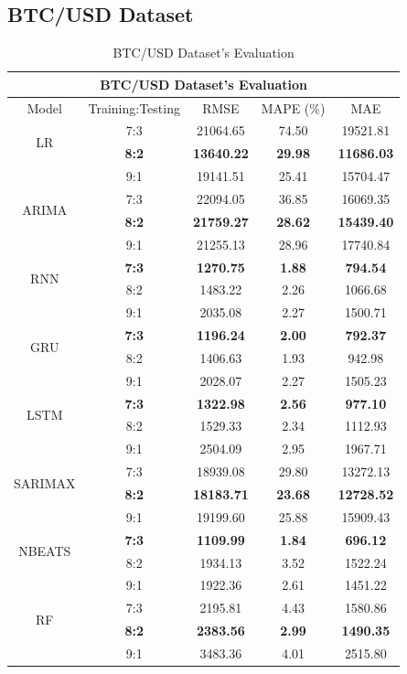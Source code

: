 \documentclass{ieeeojies}
\begin{document}
\subsection{BTC/USD Dataset}
\begin{table}[H]
	\centering
	\begin{tabular}{|c|c|c|c|c|}
		\hline
		\multicolumn{5}{|c|}{\textbf{BTC/USD Dataset's Evaluation}}\\
		\hline
		\centering Model & Training:Testing & RMSE & MAPE (\%) & MAE\\
		\hline
		\multirow{2}{*}{LR} & 7:3 & 21064.65 &  74.50 &  19521.81 \\ & \textbf{8:2} & \textbf{13640.22} &  \textbf{29.98} &  \textbf{11686.03} \\ & 9:1 & 19141.51 & 25.41 & 15704.47\\
		\hline
		\multirow{2}{*}{ARIMA} & 7:3 & 22094.05 & 36.85 & 16069.35 \\ & \textbf{8:2} & \textbf{21759.27}& \textbf{28.62} & \textbf{15439.40} \\ & 9:1 & 21255.13 & 28.96 & 17740.84\\
		\hline
		\multirow{2}{*}{RNN} & \textbf{7:3}& \textbf{1270.75} & \textbf{1.88} & \textbf{794.54}\\ & 8:2& 1483.22 & 2.26 & 1066.68 \\ & 9:1 & 2035.08 & 2.27& 1500.71\\
		\hline
		\multirow{2}{*}{GRU} & \textbf{7:3}	&  \textbf{1196.24} & \textbf{2.00} & \textbf{792.37} \\ & 8:2 & 1406.63 & 1.93 &  942.98 \\ & 9:1 & 2028.07  & 2.27 & 1505.23\\
		\hline
		\multirow{2}{*}{LSTM} & \textbf{7:3} &  \textbf{1322.98} &  \textbf{2.56} & \textbf{977.10} \\ & 8:2 &  1529.33 & 2.34 &  1112.93 \\ & 9:1 & 2504.09  & 2.95 & 1967.71\\
		\hline
		\multirow{2}{*}{SARIMAX} & 7:3	& 18939.08 & 29.80 & 13272.13 \\ & \textbf{8:2} & \textbf{18183.71} & \textbf{23.68} & \textbf{12728.52} \\ & 9:1 & 19199.60 & 25.88 & 15909.43\\
		\hline
		\multirow{2}{*}{NBEATS} & \textbf{7:3} & \textbf{1109.99} & \textbf{1.84} & \textbf{696.12} \\ & 8:2 & 1934.13 & 3.52 & 1522.24 \\ & 9:1 & 1922.36	& 2.61 & 1451.22 \\
		\hline
		\multirow{2}{*}{RF} & 7:3 & 2195.81 & 4.43 & 1580.86 \\ & \textbf{8:2} & \textbf{2383.56} & \textbf{2.99} & \textbf{1490.35} \\ & 9:1 & 3483.36 & 4.01 & 2515.80 \\
		\hline
	\end{tabular}
	\caption{BTC/USD Dataset's Evaluation}
	\label{btcresult}
\end{table}
\end{document}
